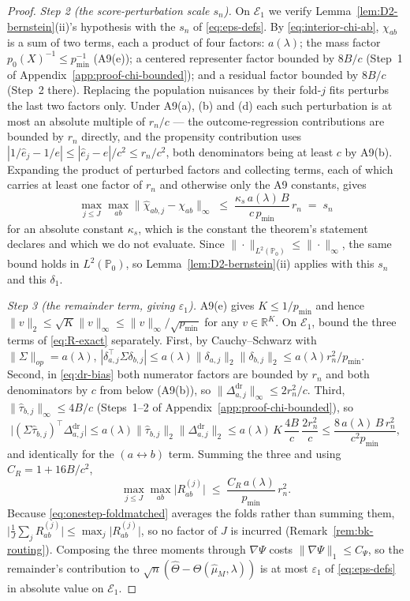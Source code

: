 \documentclass[11pt]{article}
\theoremstyle{plain}
\theoremstyle{definition}
\theoremstyle{remark}
\newcommand{\PP}{\mathbb{P}}
\newcommand{\R}{\mathbb{R}}
\newcommand{\Qhat}{\widehat{\mu}_M}
\begin{document}
\begin{proof}
\emph{Step 2 (the score-perturbation scale $s_n$).} On $\mathcal E_1$ we verify
Lemma~\ref{lem:D2-bernstein}(ii)'s hypothesis with the $s_n$ of \eqref{eq:eps-defs}. By
\eqref{eq:interior-chi-ab}, $\chi_{ab}$ is a sum of two terms, each a product of four
factors: $a(\lambda)$; the mass factor $p_0(X)^{-1}\le p_{\min}^{-1}$ (A9(e)); a centered
representer factor bounded by $8B/c$ (Step~1 of Appendix~\ref{app:proof-chi-bounded}); and
a residual factor bounded by $8B/c$ (Step~2 there). Replacing the population nuisances by
their fold-$j$ fits perturbs the last two factors only. Under A9(a), (b) and (d) each such
perturbation is at most an absolute multiple of $r_n/c$ --- the outcome-regression
contributions are bounded by $r_n$ directly, and the propensity contribution uses
$|1/\hat e_j-1/e|\le|\hat e_j-e|/c^2\le r_n/c^2$, both denominators being at least $c$ by
A9(b). Expanding the product of perturbed factors and collecting terms, each of which
carries at least one factor of $r_n$ and otherwise only the A9 constants, gives
\[
    \max_{j\le J}\max_{ab}\big\|\hat\chi_{ab,j}-\chi_{ab}\big\|_\infty
    \;\le\;\frac{\kappa_s\,a(\lambda)\,B}{c\,p_{\min}}\,r_n\;=\;s_n
\]
for an absolute constant $\kappa_s$, which is the constant the theorem's statement
declares and which we do not evaluate. Since $\|\cdot\|_{L^2(\PP_0)}\le\|\cdot\|_\infty$,
the same bound holds in $L^2(\PP_0)$, so Lemma~\ref{lem:D2-bernstein}(ii) applies with
this $s_n$ and this $\delta_1$.

\emph{Step 3 (the remainder term, giving $\varepsilon_1$).} A9(e) gives $K\le1/p_{\min}$
and hence $\|v\|_2\le\sqrt K\|v\|_\infty\le\|v\|_\infty/\sqrt{p_{\min}}$ for any
$v\in\R^K$. On $\mathcal E_1$, bound the three terms of \eqref{eq:R-exact} separately.
First, by Cauchy--Schwarz with $\|\Sigma\|_{op}=a(\lambda)$,
$|\delta_{a,j}^\top\Sigma\delta_{b,j}|\le a(\lambda)\|\delta_{a,j}\|_2\|\delta_{b,j}\|_2\le a(\lambda)r_n^2/p_{\min}$.
Second, in \eqref{eq:dr-bias} both numerator factors are bounded by $r_n$ and both
denominators by $c$ from below (A9(b)), so
$\|\Delta^{\mathrm{dr}}_{a,j}\|_\infty\le2r_n^2/c$. Third,
$\|\hat\tau_{b,j}\|_\infty\le4B/c$ (Steps~1--2 of Appendix~\ref{app:proof-chi-bounded}),
so
\[
    \big|(\Sigma\hat\tau_{b,j})^\top\Delta^{\mathrm{dr}}_{a,j}\big|
    \le a(\lambda)\|\hat\tau_{b,j}\|_2\|\Delta^{\mathrm{dr}}_{a,j}\|_2
    \le a(\lambda)\,K\,\frac{4B}{c}\,\frac{2r_n^2}{c}
    \le \frac{8\,a(\lambda)\,B\,r_n^2}{c^2p_{\min}},
\]
and identically for the $(a\leftrightarrow b)$ term. Summing the three and using
$C_R=1+16B/c^2$,
\[
    \max_{j\le J}\max_{ab}\big|R^{(j)}_{ab}\big|\;\le\;\frac{C_R\,a(\lambda)}{p_{\min}}\,r_n^2 .
\]
Because \eqref{eq:onestep-foldmatched} averages the folds rather than summing them,
$\big|\tfrac1J\sum_jR^{(j)}_{ab}\big|\le\max_j\big|R^{(j)}_{ab}\big|$, so no factor of
$J$ is incurred (Remark~\ref{rem:bk-routing}). Composing the three moments through
$\nabla\Psi$ costs $\|\nabla\Psi\|_1\le C_\Psi$, so the remainder's contribution to
$\sqrt n(\hat\Theta-\Theta(\Qhat,\lambda))$ is at most $\varepsilon_1$ of
\eqref{eq:eps-defs} in absolute value on $\mathcal E_1$.


\end{proof}
\end{document}
